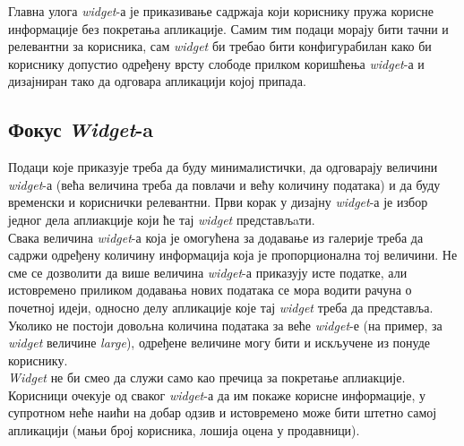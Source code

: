 \documentclass[12pt,oneside]{memoir}
\begin{document}
\indent Главна улога \textit{widget}-а је приказивање садржаја који кориснику пружа корисне информације без покретања апликације. Самим тим подаци морају бити тачни и релевантни за корисника, сам \textit{widget} би требао бити конфигурабилан како би кориснику допустио одређену врсту слободе прилком коришћења \textit{widget}-а и дизајниран тако да одговара апликацији којој припада.

\subsection{Фокус \textit{Widget}-a}
\indent  Подаци које приказује треба да буду минималистички, да одговарају величини \textit{widget}-а (већа величина треба да повлачи и већу количину података) и да буду временски и кориснички релевантни. Први корак у дизајну \textit{widget}-а је избор једног дела аплиакције који ће тај \textit{widget} представљaти. 
\\
\indent Свака величина \textit{widget}-а која је омогућена за додавање из галерије треба да садржи одређену количину информација која је пропорционална тој величини. Не сме се дозволити да више величина \textit{widget}-а приказују исте податке, али истовремено приликом додавања нових података се мора водити рачуна о почетној идеји, односно делу апликације које тај \textit{widget} треба да представља. Уколико не постоји довољна количина података за веће \textit{widget}-е (на пример, за \textit{widget} величине \textit{large}), одређене величине могу бити и искључене из понуде кориснику.
\\
\indent \textit{Widget} не би смео да служи само као пречица за покретање аплиакције. Корисници очекује од сваког \textit{widget}-а да им покаже корисне информације, у супротном неће наићи на добар одзив и истовремено може бити штетно самој апликацији (мањи број корисника, лошија оцена у продавници).
\end{document}
